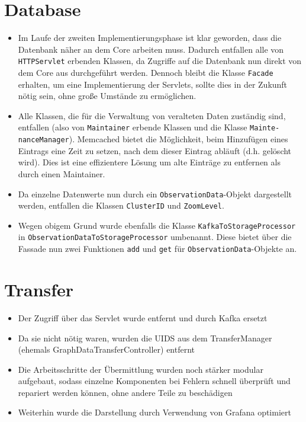 \section{Database}
\begin{itemize}
	\item Im Laufe der zweiten Implementierungsphase ist klar geworden, dass die Datenbank näher an dem Core arbeiten muss. Dadurch entfallen alle von \texttt{HTTPServlet} erbenden Klassen, da Zugriffe auf die Datenbank nun direkt von dem Core aus durchgeführt werden. Dennoch bleibt die Klasse \texttt{Facade} erhalten, um eine Implementierung der Servlets, sollte dies in der Zukunft nötig sein, ohne große Umstände zu ermöglichen.
	\item Alle Klassen, die für die Verwaltung von veralteten Daten zuständig sind, entfallen (also von \texttt{Maintainer} erbende Klassen und die Klasse \texttt{Mainte-\\nanceManager}). Memcached bietet die Möglichkeit, beim Hinzufügen eines Eintrags eine Zeit zu setzen, nach dem dieser Eintrag abläuft (d.h. gelöscht wird). Dies ist eine effizientere Lösung um alte Einträge zu entfernen als durch einen Maintainer.
	\item Da einzelne Datenwerte nun durch ein \texttt{ObservationData}-Objekt dargestellt werden, entfallen die Klassen \texttt{ClusterID} und \texttt{ZoomLevel}.
	\item Wegen obigem Grund wurde ebenfalls die Klasse \texttt{KafkaToStorageProcessor} in \texttt{ObservationDataToStorageProcessor} umbenannt. Diese bietet über die Fassade nun zwei Funktionen \texttt{add} und \texttt{get} für \texttt{ObservationData}-Objekte an.
\end{itemize}

\section{Transfer}
\begin{itemize}
	\item Der Zugriff über das Servlet wurde entfernt und durch Kafka ersetzt
	\item Da sie nicht nötig waren, wurden die UIDS aus dem TransferManager (ehemals GraphDataTransferController) entfernt
	\item Die Arbeitsschritte der Übermittlung wurden noch stärker modular aufgebaut, sodass einzelne Komponenten bei Fehlern schnell überprüft und repariert werden können, ohne andere Teile zu beschädigen
	\item Weiterhin wurde die Darstellung durch Verwendung von Grafana optimiert
\end{itemize}

